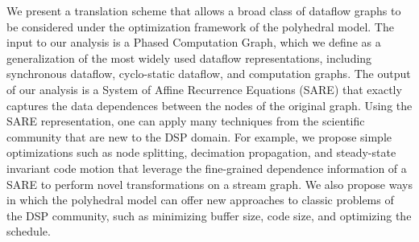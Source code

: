 We present a translation scheme that allows a broad class of dataflow
graphs to be considered under the optimization framework of the
polyhedral model.  The input to our analysis is a Phased Computation
Graph, which we define as a generalization of the most widely used
dataflow representations, including synchronous dataflow, cyclo-static
dataflow, and computation graphs.  The output of our analysis is a
System of Affine Recurrence Equations (SARE) that exactly captures the
data dependences between the nodes of the original graph.  Using the
SARE representation, one can apply many techniques from the scientific
community that are new to the DSP domain.  For example, we propose
simple optimizations such as node splitting, decimation propagation,
and steady-state invariant code motion that leverage the fine-grained
dependence information of a SARE to perform novel transformations on a
stream graph.  We also propose ways in which the polyhedral model can
offer new approaches to classic problems of the DSP community, such as
minimizing buffer size, code size, and optimizing the schedule.